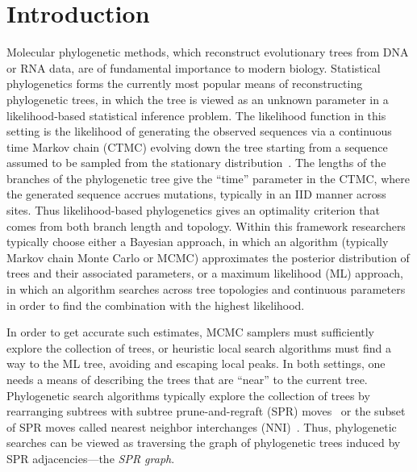 \documentclass[11pt,onecolumn,conference]{IEEEtran}
\begin{document}



\section{Introduction}
Molecular phylogenetic methods, which reconstruct evolutionary trees from DNA or RNA data, are of fundamental importance to modern biology.
Statistical phylogenetics forms the currently most popular means of reconstructing phylogenetic trees, in which the tree is viewed as an unknown parameter in a likelihood-based statistical inference problem.
The likelihood function in this setting is the likelihood of generating the observed sequences via a continuous time Markov chain (CTMC) evolving down the tree starting from a sequence assumed to be sampled from the stationary distribution~\cite{felsenstein1981evolutionary}.
The lengths of the branches of the phylogenetic tree give the ``time'' parameter in the CTMC, where the generated sequence accrues mutations, typically in an IID manner across sites.
Thus likelihood-based phylogenetics gives an optimality criterion that comes from both branch length and topology.
Within this framework researchers typically choose either a Bayesian approach, in which an algorithm (typically Markov chain Monte Carlo or MCMC) approximates the posterior distribution of trees and their associated parameters, or a maximum likelihood (ML) approach, in which an algorithm searches across tree topologies and continuous parameters in order to find the combination with the highest likelihood.

In order to get accurate such estimates, MCMC samplers must sufficiently explore the collection of trees, or heuristic local search algorithms must find a way to the ML tree, avoiding and escaping local peaks.
In both settings, one needs a means of describing the trees that are ``near'' to the current tree.
Phylogenetic search algorithms typically explore the collection of trees by rearranging subtrees with subtree prune-and-regraft (SPR) moves~\cite{hein96} or the subset of SPR moves called nearest neighbor interchanges (NNI)~\cite{robinson1971comparison}.
Thus, phylogenetic searches can be viewed as traversing the graph of phylogenetic trees induced by SPR adjacencies---the \emph{SPR graph}.
\end{document}
